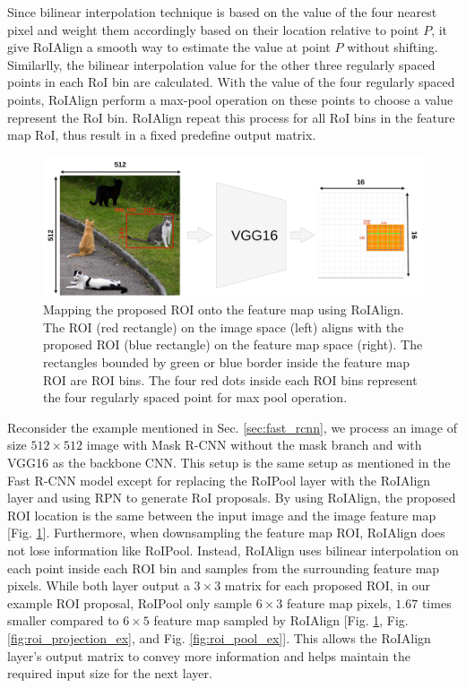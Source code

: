 \relax
{}\relax
\noindent Since bilinear interpolation technique is based on the value of the four nearest pixel and weight them accordingly based on their location relative to point $P$, it give RoIAlign a smooth way to estimate the value at point $P$ without shifting. Similarlly, the bilinear interpolation value for the other three regularly spaced points in each RoI bin are calculated. With the value of the four regularly spaced points, RoIAlign perform a max-pool operation on these points to choose a value represent the RoI bin. RoIAlign repeat this process for all RoI bins in the feature map RoI, thus result in a fixed predefine output matrix.

\begin{figure}[!ht]
    \centering
    \includegraphics[width=6in]{figures/roi_align_ex.png}
    \caption{Mapping the proposed ROI onto the feature map using RoIAlign. The ROI (red rectangle) on the image space (left) aligns with the proposed ROI (blue rectangle) on the feature map space (right). The rectangles bounded by green or blue border inside the feature map ROI are ROI bins. The four red dots inside each ROI bins represent the four regularly spaced point for max pool operation. \cite{roi_pooling_problem}}
    \label{fig:roi_align_ex}
\end{figure}

Reconsider the example mentioned in Sec. \ref{sec:fast_rcnn}, we process an image of size $512 \times 512$ image with Mask R-CNN without the mask branch and with VGG16 as the backbone CNN. This setup is the same setup as mentioned in the Fast R-CNN model except for replacing the RoIPool layer with the RoIAlign layer and using RPN to generate RoI proposals. By using RoIAlign, the proposed ROI location is the same between the input image and the image feature map [Fig. \ref{fig:roi_align_ex}]. Furthermore, when downsampling the feature map ROI, RoIAlign does not lose information like RoIPool. Instead, RoIAlign uses bilinear interpolation on each point inside each ROI bin and samples from the surrounding feature map pixels. While both layer output a $3 \times 3$ matrix for each proposed ROI, in our example ROI proposal, RoIPool only sample $6 \times 3$ feature map pixels, $1.67$ times smaller compared to $6 \times 5$ feature map sampled by RoIAlign [Fig. \ref{fig:roi_align_ex}, Fig. \ref{fig:roi_projection_ex}, and Fig. \ref{fig:roi_pool_ex}]. This allows the RoIAlign layer's output matrix to convey more information and helps maintain the required input size for the next layer.

